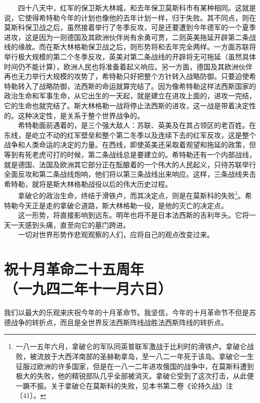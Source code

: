 \documentclass[cn,11pt,chinese]{elegantbook}
\def\myformat#1{\hfil\hfil #1}
\begin{document}
　　四十八天中，红军的保卫斯大林城，和去年保卫莫斯科市有某种相同。这就是说，它使得希特勒今年的计划也像他的去年计划一样，归于失败。其不同点，则在莫斯科保卫战之后，虽然接着举行了冬季反攻，可是还要遭到今年德军的一个夏季进攻，这是因为一则德国及其欧洲伙伴尚有余勇可贾，二则英美拖延开辟第二条战线的缘故。而在斯大林格勒保卫战之后，则形势将和去年完全两样。一方面苏联将举行极大规模的第二个冬季反攻，英美对第二条战线的开辟将无可拖延（虽然具体时间仍不能计算），欧洲人民也将准备着起义响应。另一方面，德国及其欧洲伙伴再也无力举行大规模的攻势了，希特勒只好把整个方针转入战略防御。只要迫使希特勒转入了战略防御，法西斯的命运就算完结了。因为像希特勒这样法西斯国家的政治生命和军事生命，从它出生的一天起，就是建立在进攻上面的，进攻一完结，它的生命也就完结了。斯大林格勒一战将停止法西斯的进攻，这一战是带着决定性的。这种决定性，是关系于整个世界战争的。\\
　　希特勒面前遇着的，是三个强大敌人：苏联、英美及在其占领区的老百姓。在东线，是屹立不动的红军壁垒和整个第二冬季以及连续下去的红军反攻，这是整个战争和人类命运的决定的力量。在西线，即使英美还采取着观望和拖延的政策，但等到有死老虎可打的时候，第二条战线总是要建立的。希特勒还有一个内部战线，就是德国、法国及欧洲其它部分正在酝酿着的一个伟大的人民起义，只待苏联举行全面反攻和第二条战线炮响，他们将以第三条战线出来响应。这样，三条战线夹击希特勒，就将是斯大林格勒战役以后的伟大历史过程。\\
　　拿破仑的政治生命，终结于滑铁卢，而其决定点，则是在莫斯科的失败\footnote[1]{ 一八一五年六月，拿破仑的军队同英普联军激战于比利时的滑铁卢。拿破仑战败，被流放于大西洋南部的圣赫勒拿岛，至一八二一年死于该岛。拿破仑一生征服过欧洲的许多国家，但是在一八一二年进攻俄国的战争中，在莫斯科遭到极大的失败，他的精锐部队几乎全部被消灭。拿破仑受到了这次打击，从此便一蹶不振。关于拿破仑在莫斯科的失败，见本书第二卷《论持久战》注〔41〕。}。希特勒今天正是走的拿破仑道路，斯大林格勒一役，是他的灭亡的决定点。\\
　　这一形势，将直接影响到远东。明年也将不是日本法西斯的吉利年头。它将一天一天感到头痛，直至向它的墓门跨进。\\
　　一切对世界形势作悲观观察的人们，应将自己的观点改变过来。\\
\newpage\section*{\myformat{祝十月革命二十五周年}\\\myformat{（一九四二年十一月六日）}}
我们以最大的乐观来庆祝今年的十月革命节。我坚信，今年的十月革命节不但是苏德战争的转折点，而且是全世界反法西斯阵线战胜法西斯阵线的转折点。\\
\end{document}
